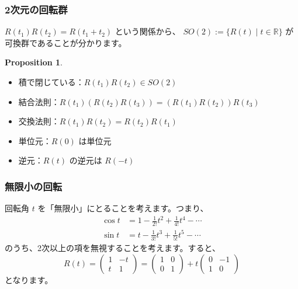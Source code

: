 \documentclass{beamer}
\theoremstyle{definition}
\newtheorem{proposition}{Proposition}
\begin{document}
\begin{frame}
    \frametitle{2次元の回転群}

    \(R(t_1) R(t_2) = R(t_1 + t_2)\) という関係から、
    \(\mathit{SO}(2) := \{R(t) \mid t \in \mathbb{R}\} \) が可換群であることが分かります。

    \begin{proposition}
        \begin{itemize}
            \item 積で閉じている：\(R(t_1) R(t_2) \in \mathit{SO}(2)\)
            \item 結合法則：\(R(t_1) (R(t_2) R(t_3)) = (R(t_1) R(t_2)) R(t_3)\)
            \item 交換法則：\(R(t_1) R(t_2) = R(t_2) R(t_1)\)
            \item 単位元：\(R(0)\) は単位元
            \item 逆元：\(R(t)\) の逆元は \(R(- t)\)
        \end{itemize}
    \end{proposition}
\end{frame}

\begin{frame}
    \frametitle{無限小の回転}

    回転角 \(t\) を「無限小」にとることを考えます。つまり、
    \begin{align*}
        \cos t & = 1 - \frac{1}{2!}t^2 + \frac{1}{4!}t^4 - \cdots \\
        \sin t & = t - \frac{1}{3!}t^3 + \frac{1}{5!}t^5 - \cdots
    \end{align*}
    のうち、2次以上の項を無視することを考えます。すると、
    \[
        R(t) =
        \begin{pmatrix}
            1 & - t \\
            t & 1
        \end{pmatrix}
        =
        \begin{pmatrix}
            1 & 0 \\
            0 & 1
        \end{pmatrix}
        + t
        \begin{pmatrix}
            0 & - 1 \\
            1 & 0
        \end{pmatrix}
    \]
    となります。
\end{frame}
\end{document}
